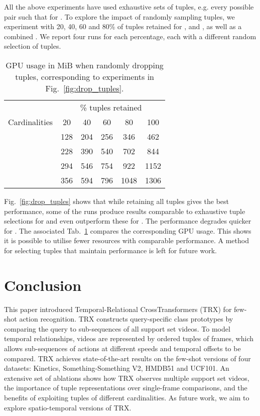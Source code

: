 \documentclass[final]{cvpr}
\begin{document}
All the above experiments have used exhaustive sets of tuples, e.g. every possible pair  such that  for .  To explore the impact of randomly sampling tuples, we experiment with 20, 40, 60 and 80\% of tuples retained for ,  and , as well as a combined . We report four runs for each percentage, each with a different random selection of tuples.
\begin{table}[t]
\small
\begin{tabular}{lccccc}
\toprule 
&   \multicolumn{5}{c}{\% tuples retained} \\
\cmidrule(){2-6}
Cardinalities  \hspace{3mm}         &   20   &   40   &   60     &   80     &   100   \\ \midrule
        &   128 &   204 &   256 &   346 &   462\\ 
        &   228 &   390 &   540 &   702 &   844\\ 
        &   294 &   546 &   754 &   922 &   1152\\ 
      &   356 &   594 &   796 &   1048 &   1306\\
\bottomrule
\end{tabular}
\vspace{-5pt}
\caption{GPU usage in MiB when randomly dropping tuples, corresponding to experiments in Fig.~\ref{fig:drop_tuples}.\vspace{-10pt}}
\label{tab:drop_tuples}
\end{table}

Fig.~\ref{fig:drop_tuples}  shows that while retaining all tuples gives the best performance, some of the runs produce results comparable to exhaustive tuple selections for  and even outperform these for . The performance degrades quicker for .  The associated Tab.~\ref{tab:drop_tuples} compares the corresponding GPU usage. This shows it is possible to utilise fewer resources with comparable performance. A method for selecting tuples that maintain performance is left for future work.

\vspace{-5pt}
\section{Conclusion}
\vspace{-2pt}

This paper introduced Temporal-Relational CrossTransformers (TRX) for few-shot action recognition.  TRX constructs query-specific class prototypes by comparing the query to sub-sequences of all support set videos.  To model temporal relationships, videos are represented by ordered tuples of frames, which allows sub-sequences of actions at different speeds and temporal offsets to be compared.
TRX achieves state-of-the-art results on the few-shot versions of four datasets: Kinetics, Something-Something V2, HMDB51 and UCF101.
An extensive set of ablations shows how TRX observes multiple support set videos, the importance of tuple representations over single-frame comparisons, and the benefits of exploiting tuples of different cardinalities.
As future work, we aim to explore spatio-temporal versions of TRX. 
\end{document}
